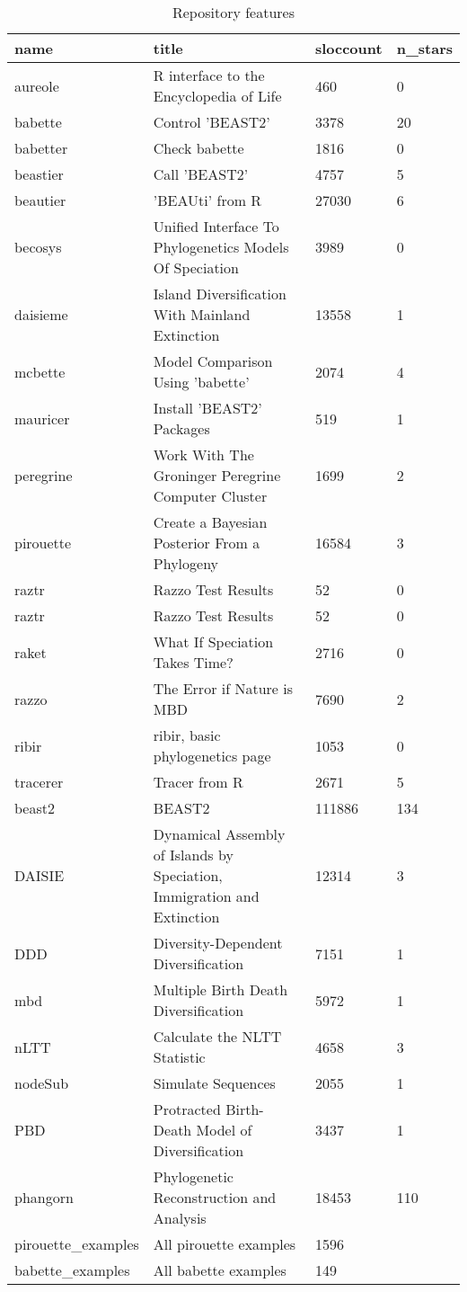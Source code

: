 \begin{table}[ht]
\centering
\begin{tabular}{p{}p{}p{}p{}}
  \hline
name & title & sloccount & n\_stars \\ 
  \hline
aureole & R interface to the Encyclopedia of Life & 460 &   0 \\ 
  babette & Control 'BEAST2' & 3378 &  20 \\ 
  babetter & Check babette & 1816 &   0 \\ 
  beastier & Call 'BEAST2' & 4757 &   5 \\ 
  beautier & 'BEAUti' from R & 27030 &   6 \\ 
  becosys & Unified Interface To Phylogenetics Models Of Speciation & 3989 &   0 \\ 
  daisieme & Island Diversification With Mainland Extinction & 13558 &   1 \\ 
  mcbette & Model Comparison Using 'babette' & 2074 &   4 \\ 
  mauricer & Install 'BEAST2' Packages & 519 &   1 \\ 
  peregrine & Work With The Groninger Peregrine Computer Cluster & 1699 &   2 \\ 
  pirouette & Create a Bayesian Posterior From a Phylogeny & 16584 &   3 \\ 
  raztr & Razzo Test Results &  52 &   0 \\ 
  raztr & Razzo Test Results &  52 &   0 \\ 
  raket & What If Speciation Takes Time? & 2716 &   0 \\ 
  razzo & The Error if Nature is MBD & 7690 &   2 \\ 
  ribir & ribir, basic phylogenetics page & 1053 &   0 \\ 
  tracerer & Tracer from R & 2671 &   5 \\ 
  beast2 & BEAST2 & 111886 & 134 \\ 
  DAISIE & Dynamical Assembly of Islands by Speciation, Immigration and
        Extinction & 12314 &   3 \\ 
  DDD & Diversity-Dependent Diversification & 7151 &   1 \\ 
  mbd & Multiple Birth Death Diversification & 5972 &   1 \\ 
  nLTT & Calculate the NLTT Statistic & 4658 &   3 \\ 
  nodeSub & Simulate Sequences & 2055 &   1 \\ 
  PBD & Protracted Birth-Death Model of Diversification & 3437 &   1 \\ 
  phangorn & Phylogenetic Reconstruction and Analysis & 18453 & 110 \\ 
  pirouette\_examples & All pirouette examples & 1596 &  \\ 
  babette\_examples & All babette examples & 149 &  \\ 
   \hline
\end{tabular}
\caption{Repository features} 
\label{tab:repos}
\end{table}

